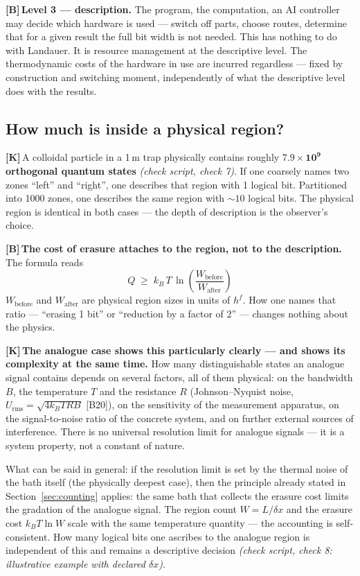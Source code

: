 \documentclass[11pt,a4paper]{article}
\newcommand{\LK}{\textcolor{layK}{\textbf{\footnotesize\textsf{[K]}}}\,}
\newcommand{\LB}{\textcolor{layB}{\textbf{\footnotesize\textsf{[B]}}}\,}
\newcommand{\pruef}[1]{{\small\itshape(check script, #1)}}
\begin{document}
\LB \textbf{Level 3 --- description.} The program, the computation, an AI
controller may decide which hardware is used --- switch off parts, choose routes,
determine that for a given result the full bit width is not needed. This has
nothing to do with Landauer. It is resource management at the descriptive level.
The thermodynamic costs of the hardware in use are incurred regardless --- fixed
by construction and switching moment, independently of what the descriptive level
does with the results.

\subsection{How much is inside a physical region?}

\LK A colloidal particle in a 1\,\textmu m trap physically contains roughly
$\mathbf{7.9\times10^{9}}$ \textbf{orthogonal quantum states}
\pruef{check 7}. If one coarsely names two zones “left” and “right”, one describes
that region with 1 logical bit. Partitioned into 1000 zones, one describes the
same region with ${\sim}10$ logical bits. The physical region is identical in both
cases --- the depth of description is the observer's choice.

\LB \textbf{The cost of erasure attaches to the region, not to the description.}
The formula reads
\[
  \boxed{\;Q \;\ge\; k_B\,T\,\ln\!\left(\frac{W_{\text{before}}}{W_{\text{after}}}\right)\;}
\]
$W_{\text{before}}$ and $W_{\text{after}}$ are physical region sizes in units of
$h^f$. How one names that ratio --- “erasing 1 bit” or “reduction by a factor of
2” --- changes nothing about the physics.

\LK \textbf{The analogue case shows this particularly clearly --- and shows its
complexity at the same time.} How many distinguishable states an analogue signal
contains depends on several factors, all of them physical: on the bandwidth $B$,
the temperature $T$ and the resistance $R$ (Johnson--Nyquist noise,
$U_{\text{rms}} = \sqrt{4 k_B T R B}$ [B20]), on the sensitivity of the
measurement apparatus, on the signal-to-noise ratio of the concrete system, and on
further external sources of interference. There is no universal resolution limit
for analogue signals --- it is a system property, not a constant of nature.

What can be said in general: if the resolution limit is set by the thermal noise
of the bath itself (the physically deepest case), then the principle already
stated in Section~\ref{sec:counting} applies: the same bath that collects the
erasure cost limits the gradation of the analogue signal. The region count
$W = L/\delta x$ and the erasure cost $k_B T \ln W$ scale with the same
temperature quantity --- the accounting is self-consistent. How many logical bits
one ascribes to the analogue region is independent of this and remains a
descriptive decision \pruef{check 8: illustrative example with declared
$\delta x$}.
\end{document}
